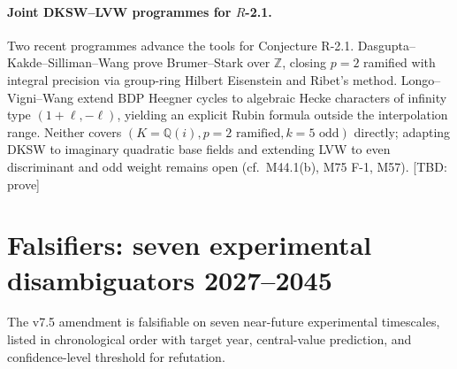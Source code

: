\documentclass[a4paper,11pt]{article}
\theoremstyle{definition}
\theoremstyle{remark}
\begin{document}
\paragraph{Joint DKSW--LVW programmes for $R$-2.1.}
Two recent programmes advance the tools for Conjecture R-2.1. Dasgupta--Kakde--Silliman--Wang \cite{DKSW23} prove Brumer--Stark over $\mathbb{Z}$, closing $p=2$ ramified with integral precision via group-ring Hilbert Eisenstein and Ribet's method. Longo--Vigni--Wang \cite{LVW2025} extend BDP Heegner cycles to algebraic Hecke characters of infinity type $(1+\ell, -\ell)$, yielding an explicit Rubin formula outside the interpolation range. Neither covers $(K=\mathbb{Q}(i), p=2 \text{ ramified}, k=5 \text{ odd})$ directly; adapting DKSW to imaginary quadratic base fields and extending LVW to even discriminant and odd weight remains open (cf.~M44.1(b), M75 F-1, M57). [TBD: prove]

\section{Falsifiers: seven experimental disambiguators 2027--2045}
\label{sec:falsifiers}

The v7.5 amendment is falsifiable on seven near-future
experimental timescales, listed in chronological order with
target year, central-value prediction, and confidence-level
threshold for refutation.
\end{document}
